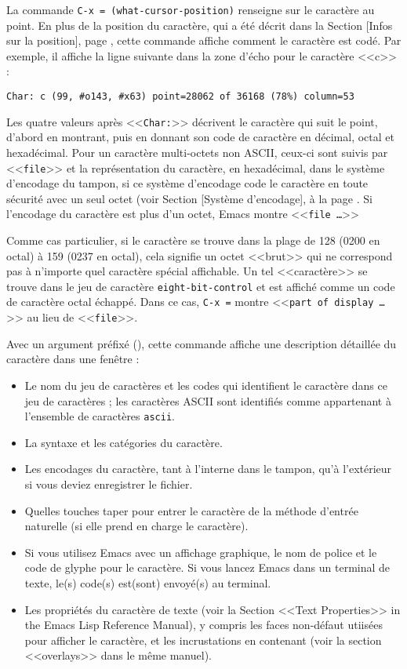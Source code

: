 La commande \texttt{C-x = (what-cursor-position)} renseigne sur le
caractère au point. En plus de la position du caractère, qui a été
décrit dans la Section  [Infos sur la position], page
, cette commande affiche comment le caractère est
codé. Par exemple, il affiche la ligne suivante dans la zone d'écho
pour le caractère <<c>> : 
\begin{center}
  \texttt{Char: c (99, \#o143, \#x63) point=28062 of 36168 (78\%) column=53}
\end{center}
Les quatre valeurs après <<\texttt{Char:}>> décrivent le caractère qui
suit le point, d'abord en montrant, puis en donnant son code de
caractère en décimal, octal et hexadécimal. Pour un caractère
multi-octets non ASCII, ceux-ci sont suivis par <<\texttt{file}>> et
la représentation du caractère, en hexadécimal, dans le système
d'encodage du tampon, si ce système d'encodage code le caractère en
toute sécurité avec un seul octet (voir Section  [Système
d'encodage], à la page . Si l'encodage du caractère est
plus d'un octet, Emacs montre <<\texttt{file \dots}>>

Comme cas particulier, si le caractère se trouve dans la plage de 128
(0200 en octal) à 159 (0237 en octal), cela signifie un octet <<brut>>
qui ne correspond pas à n'importe quel caractère spécial
affichable. Un tel <<caractère>> se trouve dans le jeu de caractère
\texttt{eight-bit-control} et est affiché comme un code de caractère
octal échappé. Dans ce cas, \texttt{C-x =} montre <<\texttt{part of
  display \dots}>> au lieu de <<\texttt{file}>>.

Avec un argument préfixé (), cette commande affiche
une description détaillée du caractère dans une fenêtre : 
\begin{itemize}
\item Le nom du jeu de caractères et les codes qui identifient le
  caractère dans ce jeu de caractères ; les caractères ASCII sont
  identifiés comme appartenant à l'ensemble de caractères \texttt{ascii}.
\item La syntaxe et les catégories du caractère.
\item Les encodages du caractère, tant à l'interne dans le tampon,
  qu'à l'extérieur si vous deviez enregistrer le fichier.
\item Quelles touches taper pour entrer le caractère de la méthode
  d'entrée naturelle (si elle prend en charge le caractère).
\item Si vous utilisez Emacs avec un affichage graphique, le nom de
  police et le code de glyphe pour le caractère. Si vous lancez Emacs
  dans un terminal de texte, le(s) code(s) est(sont) envoyé(s) au
  terminal.
\item Les propriétés du caractère de texte (voir la Section <<Text
  Properties>> in the Emacs Lisp Reference Manual), y compris les
  faces non-défaut utiisées pour afficher le caractère, et les
  incrustations en contenant (voir la section <<overlays>> dans le
  même manuel). 
\end{itemize}

